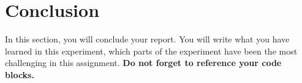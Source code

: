 \documentclass{article}
\begin{document}
\section{Conclusion}
In this section, you will conclude your report. You will write what you have learned in this experiment, which parts of the experiment have been the most challenging in this assignment. \textbf{Do not forget to reference your code blocks. \cite{adams1995hitchhiker}}



\end{document}
